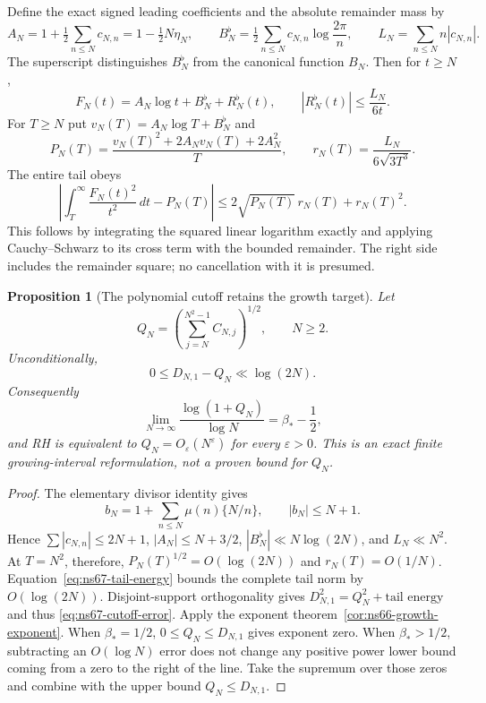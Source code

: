 \documentclass[11pt]{article}
\newtheorem{proposition}[theorem]{Proposition}
\theoremstyle{remark}
\begin{document}
Define the exact signed leading coefficients and the absolute remainder
mass by
\[
 A_N=1+\tfrac12\sum_{n\leq N}c_{N,n}=1-\tfrac12N\eta_N,
 \qquad B_N^\flat=\tfrac12\sum_{n\leq N}c_{N,n}\log\frac{2\pi}{n},
 \qquad L_N=\sum_{n\leq N}n|c_{N,n}|.
\]
The superscript distinguishes $B_N^\flat$ from the canonical function $B_N$.
Then for $t\geq N$,
\begin{equation}
 F_N(t)=A_N\log t+B_N^\flat+R_N^\flat(t),\qquad
 |R_N^\flat(t)|\leq\frac{L_N}{6t}.
 \label{eq:ns67-full-tail}
\end{equation}
For $T\geq N$ put $v_N(T)=A_N\log T+B_N^\flat$ and
\[
 P_N(T)=\frac{v_N(T)^2+2A_Nv_N(T)+2A_N^2}{T},\qquad
 r_N(T)=\frac{L_N}{6\sqrt{3T^3}}.
\]
The entire tail obeys
\begin{equation}
 \left|\int_T^\infty\frac{F_N(t)^2}{t^2}\,dt-P_N(T)\right|
       \leq2\sqrt{P_N(T)}\,r_N(T)+r_N(T)^2.
 \label{eq:ns67-tail-energy}
\end{equation}
This follows by integrating the squared linear logarithm exactly and
applying Cauchy--Schwarz to its cross term with the bounded remainder.
The right side includes the remainder square; no cancellation with it
is presumed.

\begin{proposition}[The polynomial cutoff retains the growth target]
\label{prop:ns67-polynomial-cutoff}
Let
\[
 Q_N=\left(\sum_{j=N}^{N^2-1}C_{N,j}\right)^{1/2},\qquad N\geq2.
\]
Unconditionally,
\begin{equation}
 0\leq D_{N,1}-Q_N\ll\log(2N).
 \label{eq:ns67-cutoff-error}
\end{equation}
Consequently
\[
 \lim_{N\to\infty}\frac{\log(1+Q_N)}{\log N}=\beta_*-\frac12,
\]
and RH is equivalent to $Q_N=O_\varepsilon(N^\varepsilon)$ for every
$\varepsilon>0$. This is an exact finite growing-interval reformulation,
not a proven bound for $Q_N$.
\end{proposition}
\begin{proof}
The elementary divisor identity gives
\[
 b_N=1+\sum_{n\leq N}\mu(n)\{N/n\},\qquad |b_N|\leq N+1.
\]
Hence $\sum|c_{N,n}|\leq2N+1$, $|A_N|\leq N+3/2$,
$|B_N^\flat|\ll N\log(2N)$, and $L_N\ll N^2$.
At $T=N^2$, therefore, $P_N(T)^{1/2}=O(\log(2N))$ and
$r_N(T)=O(1/N)$. Equation~\eqref{eq:ns67-tail-energy} bounds the
complete tail norm by $O(\log(2N))$. Disjoint-support orthogonality
gives $D_{N,1}^2=Q_N^2+\text{tail energy}$ and thus
\eqref{eq:ns67-cutoff-error}.
Apply the exponent theorem~\ref{cor:ns66-growth-exponent}. When
$\beta_*=1/2$, $0\leq Q_N\leq D_{N,1}$ gives exponent zero.
When $\beta_*>1/2$, subtracting an $O(\log N)$ error does not change
any positive power lower bound coming from a zero to the right of the
line. Take the supremum over those zeros and combine with the upper
bound $Q_N\leq D_{N,1}$.
\end{proof}
\end{document}
